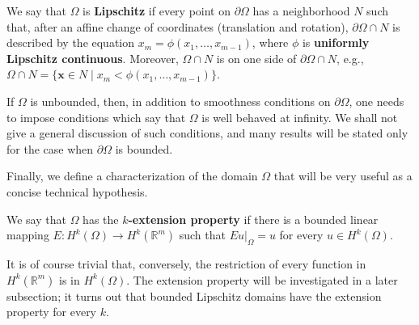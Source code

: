 \begin{Definition}
\label{def:lipschitz-domain}
We say that $\Omega$ is \textbf{Lipschitz} if every point on $\partial\Omega$ has a neighborhood $N$ such that, after an affine change of coordinates (translation and rotation), $\partial\Omega\cap N$ is described by the equation $x_m=\phi(x_1,\ldots,x_{m-1})$, where $\phi$ is \textbf{uniformly Lipschitz continuous}. Moreover, $\Omega\cap N$ is on one side of $\partial\Omega\cap N$, e.g., $\Omega\cap N=\{\bm{x}\in N\mid x_m<\phi(x_1,\ldots,x_{m-1})\}$.
\end{Definition}

If $\Omega$ is unbounded, then, in addition to smoothness conditions on $\partial\Omega$, one needs to impose conditions which say that $\Omega$ is well behaved at infinity. We shall not give a general discussion of such conditions, and many results will be stated only for the case when $\partial\Omega$ is bounded.

Finally, we define a characterization of the domain $\Omega$ that will be very useful as a concise technical hypothesis.

\begin{Definition}
\label{def:sobolev-k-extension-property}
We say that $\Omega$ has the \textbf{$k$-extension property} if there is a bounded linear mapping $E:H^k(\Omega)\to H^k(\mathbb{R}^m)$ such that $Eu|_{\Omega}=u$ for every $u\in H^k(\Omega)$.
\end{Definition}

It is of course trivial that, conversely, the restriction of every function in $H^k(\mathbb{R}^m)$ is in $H^k(\Omega)$. The extension property will be investigated in a later subsection; it turns out that bounded Lipschitz domains have the extension property for every $k$.
